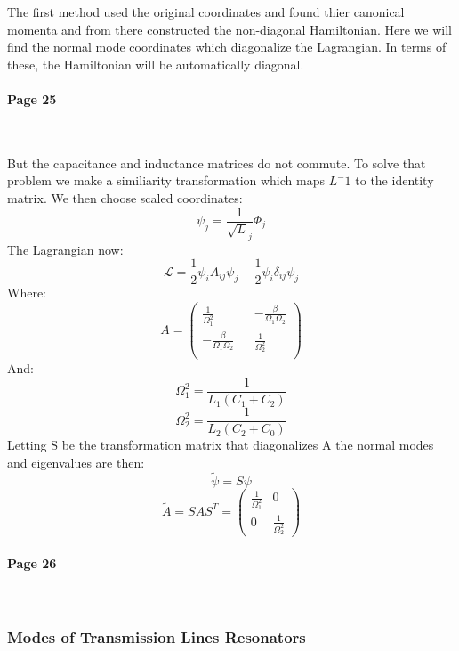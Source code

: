 \documentclass[12pt]{article}
\numberwithin{equation}{subsection}
\newcommand\page[1]{
{
\color{blue}\paragraph{
Page #1
}\mbox{}\\
}
}
\begin{document}
The first method used the original coordinates and found thier canonical momenta and from there constructed the non-diagonal Hamiltonian. Here we will find the normal mode coordinates which diagonalize the Lagrangian. In terms of these, the Hamiltonian will be automatically diagonal. 

\page{25}

But the capacitance and inductance matrices do not commute. To solve that problem we make a similiarity transformation which maps $L^-1$ to the identity matrix. We then choose scaled coordinates:
\begin{equation}
    \psi_j = \frac{1}{\sqrt L_j} \Phi_j
\end{equation}
The Lagrangian now:
\begin{equation}
   \mathcal{L} = \frac{1}{2}\dot \psi_iA_{ij}\dot\psi_j-\frac{1}{2} \psi_i\delta_{ij}\psi_j 
\end{equation}
Where:
\begin{equation}
   A= \begin{pmatrix}
   \frac{1}{\Omega_1^2} && -\frac{\beta}{\Omega_1\Omega_2}\\
 -\frac{\beta}{\Omega_1\Omega_2}  && \frac{1}{\Omega_2^2} \\
    \end{pmatrix}
\end{equation}
And:
\begin{equation}
    \Omega^2_1 = \frac{1}{L_1(C_1+C_2)}
\end{equation}
\begin{equation}
    \Omega^2_2 = \frac{1}{L_2(C_2+C_0)}
\end{equation}
Letting S be the transformation matrix that diagonalizes A the normal modes and eigenvalues are then:
\begin{equation}
    \tilde \psi = S \psi 
\end{equation}
\begin{equation}
    \tilde A = S A S^T = \begin{pmatrix}
    \frac{1}{\Omega^2_1} & 0\\
    0 & \frac{1}{\Omega^2_2}
    \end{pmatrix}
\end{equation}

\page{26}

\subsubsection{Modes of Transmission Lines Resonators}
\end{document}
